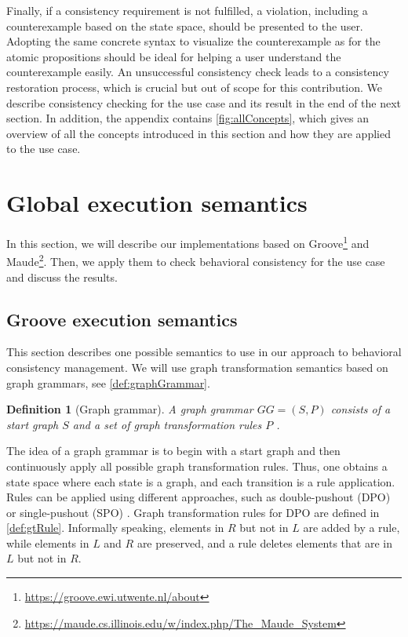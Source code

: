 \documentclass{jot}
\newtheorem{definition}{Definition}
\begin{document}
Finally, if a consistency requirement is not fulfilled, a violation, including a counterexample based on the state space, should be presented to the user.
Adopting the same concrete syntax to visualize the counterexample as for the atomic propositions should be ideal for helping a user understand the counterexample easily. 
An unsuccessful consistency check leads to a consistency restoration process, which is crucial but out of scope for this contribution.
We describe consistency checking for the use case and its result in the end of the next section.
In addition, the appendix contains \autoref{fig:allConcepts}, which gives an overview of all the concepts introduced in this section and how they are applied to the use case.

\section{Global execution semantics} \label{sec:global_execution_semantics}
In this section, we will describe our implementations based on Groove\footnote{\url{https://groove.ewi.utwente.nl/about}} and Maude\footnote{\url{https://maude.cs.illinois.edu/w/index.php/The_Maude_System}}.
Then, we apply them to check behavioral consistency for the use case and discuss the results.

\subsection{Groove execution semantics} 

This section describes one possible semantics to use in our approach to behavioral consistency management.
We will use graph transformation semantics based on graph grammars, see \autoref{def:graphGrammar}.

\begin{definition}[Graph grammar] \label{def:graphGrammar}
A graph grammar $GG=(S, P)$ consists of a start graph $S$ and a set of graph transformation rules $P$ \cite{ehrigFundamentalsAlgebraicGraph2006}. 
\end{definition}

The idea of a graph grammar is to begin with a start graph and then continuously apply all possible graph transformation rules.
Thus, one obtains a state space where each state is a graph, and each transition is a rule application.
Rules can be applied using different approaches, such as double-pushout (DPO) \cite{ehrigFundamentalsAlgebraicGraph2006} or single-pushout (SPO) \cite{loweAlgebraicApproachSinglepushout1993}.
Graph transformation rules for DPO are defined in \autoref{def:gtRule}.
Informally speaking, elements in $R$ but not in $L$ are added by a rule, while elements in $L$ and $R$ are preserved, and a rule deletes elements that are in $L$ but not in $R$.
\end{document}
